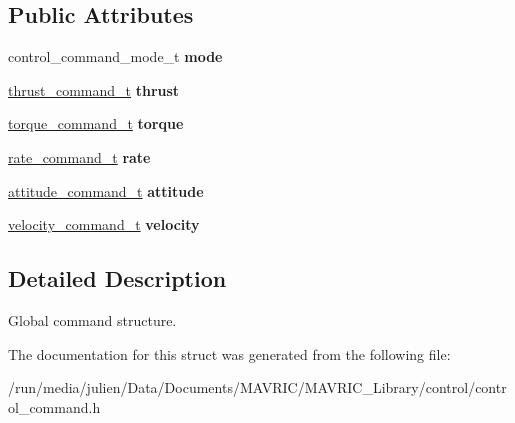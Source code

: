 \subsection*{Public Attributes}
\begin{DoxyCompactItemize}
\item 
\hypertarget{structcommand__t_ada6f9d9092f2528c3e5ef378a163216f}{control\+\_\+command\+\_\+mode\+\_\+t {\bfseries mode}}\label{structcommand__t_ada6f9d9092f2528c3e5ef378a163216f}

\item 
\hypertarget{structcommand__t_a1b483cec6dd356481774b13bd50ccac8}{\hyperlink{structthrust__command__t}{thrust\+\_\+command\+\_\+t} {\bfseries thrust}}\label{structcommand__t_a1b483cec6dd356481774b13bd50ccac8}

\item 
\hypertarget{structcommand__t_ad37d49bf12c3a50ffd93545adf044185}{\hyperlink{structtorque__command__t}{torque\+\_\+command\+\_\+t} {\bfseries torque}}\label{structcommand__t_ad37d49bf12c3a50ffd93545adf044185}

\item 
\hypertarget{structcommand__t_abe03f9ba4c033a2c08b6a8238ae290dc}{\hyperlink{structrate__command__t}{rate\+\_\+command\+\_\+t} {\bfseries rate}}\label{structcommand__t_abe03f9ba4c033a2c08b6a8238ae290dc}

\item 
\hypertarget{structcommand__t_ac51293f44de7c017186dcaff83b3e336}{\hyperlink{structattitude__command__t}{attitude\+\_\+command\+\_\+t} {\bfseries attitude}}\label{structcommand__t_ac51293f44de7c017186dcaff83b3e336}

\item 
\hypertarget{structcommand__t_afa35a9fcb7d7ff418fc77466429e17a4}{\hyperlink{structvelocity__command__t}{velocity\+\_\+command\+\_\+t} {\bfseries velocity}}\label{structcommand__t_afa35a9fcb7d7ff418fc77466429e17a4}

\end{DoxyCompactItemize}


\subsection{Detailed Description}
Global command structure. 

The documentation for this struct was generated from the following file\+:\begin{DoxyCompactItemize}
\item 
/run/media/julien/\+Data/\+Documents/\+M\+A\+V\+R\+I\+C/\+M\+A\+V\+R\+I\+C\+\_\+\+Library/control/control\+\_\+command.\+h\end{DoxyCompactItemize}
